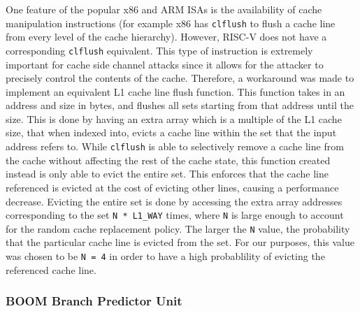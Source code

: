 One feature of the popular x86 and ARM ISAs is the availability of cache manipulation instructions
(for example x86 has {\tt clflush} to flush a cache line from every level of the cache hierarchy).
However, RISC-V does not have a corresponding {\tt clflush} equivalent.
This type of instruction is extremely important for cache side channel attacks since it allows for
the attacker to precisely control the contents of the cache.
Therefore, a workaround was made to implement an equivalent
L1 cache line flush function. This function takes in an address and size in bytes, and flushes
all sets starting from that address until the size. This is done by having an extra array which 
is a multiple of the L1 cache size, that when indexed into, evicts a cache line within the set that the input
address refers to.
While {\tt clflush} is able to selectively remove a cache line from the cache without 
affecting the rest of the cache state, this function created instead is only able to evict the entire set.
This enforces that the cache line referenced is evicted at the cost of evicting other lines, causing a performance
decrease. Evicting the entire set is done by accessing the extra array addresses corresponding to the set 
{\tt N * L1\_WAY} times, where {\tt N} is large enough to account for the random cache replacement policy. The larger
the {\tt N} value, the probability that the particular cache line is evicted from the set. For our purposes, this value
was chosen to be {\tt N = 4} in order to have a high probablility of evicting the referenced cache line.

\subsubsection{BOOM Branch Predictor Unit}


